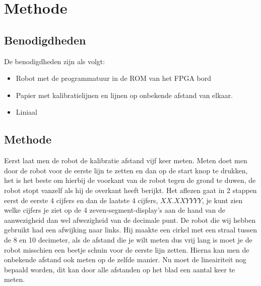 \documentclass[a4paper]{article}
\begin{document}
\section{Methode}
\subsection{Benodigdheden}
De benodigdheden zijn als volgt:
\begin{itemize}
\item Robot met de programmatuur in de ROM van het FPGA bord
\item Papier met kalibratielijnen en lijnen op onbekende afstand van elkaar.
\item Liniaal
\end{itemize}
\subsection{Methode}
Eerst laat men de robot de kalibratie afstand vijf keer meten. Meten doet men door de robot voor de eerste lijn te zetten en dan op de start knop te drukken, het is het beste om hierbij de voorkant van de robot tegen de grond te duwen, de robot stopt vanzelf als hij de overkant heeft berijkt. Het aflezen gaat in 2 stappen eerst de eerste 4 cijfers en dan de laatste 4 cijfers, $XX.XXYYYY$, je kunt zien welke cijfers je ziet op de 4 zeven-segment-display's aan de hand van de aanwezigheid dan wel afwezigheid van de decimale punt. De robot die wij hebben gebruikt had een afwijking naar links. Hij maakte een cirkel met een straal tussen de 8 en 10 decimeter, als de afstand die je wilt meten dus vrij lang is moet je de robot misschien een beetje schuin voor de eerste lijn zetten.
Hierna kan men de onbekende afstand ook meten op de zelfde manier.
Nu moet de lineairiteit nog bepaald worden, dit kan door alle afstanden op het blad een aantal keer te meten.
\end{document}
